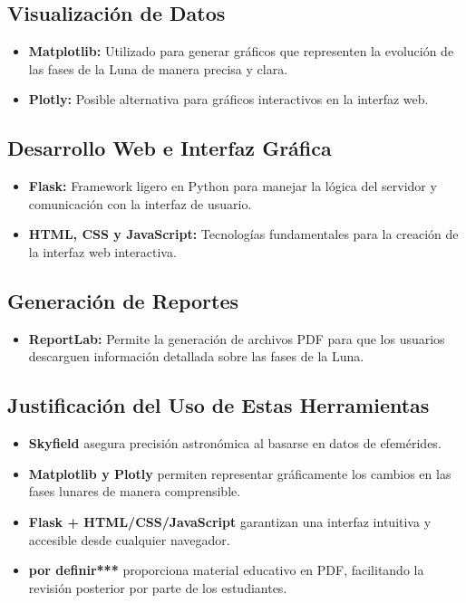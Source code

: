 \subsection*{Visualización de Datos}
\begin{itemize}
    \item \textbf{Matplotlib:} Utilizado para generar gráficos que representen la evolución de las fases de la Luna de manera precisa y clara.
    \item \textbf{Plotly:} Posible alternativa para gráficos interactivos en la interfaz web.
\end{itemize}

\subsection*{Desarrollo Web e Interfaz Gráfica}
\begin{itemize}
    \item \textbf{Flask:} Framework ligero en Python para manejar la lógica del servidor y comunicación con la interfaz de usuario.
    \item \textbf{HTML, CSS y JavaScript:} Tecnologías fundamentales para la creación de la interfaz web interactiva.
\end{itemize}

\subsection*{Generación de Reportes}
\begin{itemize}
    \item \textbf{ReportLab:} Permite la generación de archivos PDF para que los usuarios descarguen información detallada sobre las fases de la Luna.
\end{itemize}

\subsection*{Justificación del Uso de Estas Herramientas}
\begin{itemize}
    \item \textbf{Skyfield} asegura precisión astronómica al basarse en datos de efemérides.
    \item \textbf{Matplotlib y Plotly} permiten representar gráficamente los cambios en las fases lunares de manera comprensible.
    \item \textbf{Flask + HTML/CSS/JavaScript} garantizan una interfaz intuitiva y accesible desde cualquier navegador.
    \item \textbf{por definir***} proporciona material educativo en PDF, facilitando la revisión posterior por parte de los estudiantes.
\end{itemize}

